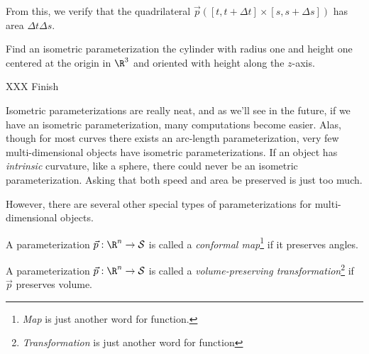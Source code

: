 \begin{example}
\begin{center}
	\end{center}

	From this, we verify that the quadrilateral $\vec p([t,t+\Delta t]\times[s,s+\Delta s])$ has area $\Delta t\Delta s$.
\end{example}

\begin{example}
	Find an isometric parameterization the cylinder with radius one and height one centered at
	the origin in $\R^3$ and oriented with height along the $z$-axis.

	XXX Finish
\end{example}

Isometric parameterizations are really neat, and as we'll see in the future, if we have an isometric
parameterization, many computations become easier.  Alas, though for most curves there exists
an arc-length parameterization, very few multi-dimensional objects have isometric parameterizations.
If an object has \emph{intrinsic} curvature, like a sphere, there could never be an isometric parameterization.
Asking that both speed and area be preserved is just too much.

However, there are several other special types of parameterizations for multi-dimensional objects.

\begin{definition}
	A parameterization $\vec p:\R^n\to\mathcal S$ is called a \emph{conformal map}\footnote{ \emph{Map}
	is just another word for function.}
	if it preserves angles.
\end{definition}

\begin{definition}
	A parameterization $\vec p:\R^n\to\mathcal S$ is called a \emph{volume-preserving transformation}\footnote{ 
	\emph{Transformation} is just another word for function} if $\vec p$ preserves volume.
\end{definition}

